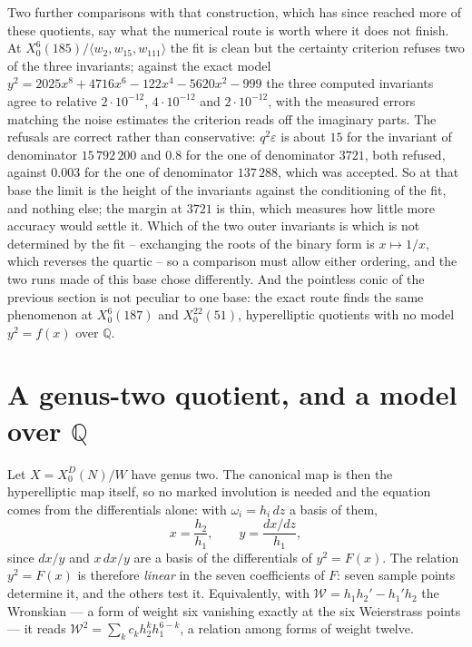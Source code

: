 \documentclass[11pt,reqno]{amsart}
\theoremstyle{plain}
\theoremstyle{definition}
\newcommand{\Q}{\mathbb{Q}}
\begin{document}
Two further comparisons with that construction, which has since reached more of these quotients,
say what the numerical route is worth where it does not finish. At
$X_0^{6}(185)/\langle w_2,w_{15},w_{111}\rangle$ the fit is clean but the certainty criterion
refuses two of the three invariants; against the exact model
$y^2=2025x^8+4716x^6-122x^4-5620x^2-999$ the three computed invariants agree to relative
$2\cdot10^{-12}$, $4\cdot10^{-12}$ and $2\cdot10^{-12}$, with the measured errors matching the
noise estimates the criterion reads off the imaginary parts. The refusals are correct rather than
conservative: $q^2\varepsilon$ is about $15$ for the invariant of denominator $15\,792\,200$ and
$0.8$ for the one of denominator $3721$, both refused, against $0.003$ for the one of denominator
$137\,288$, which was accepted. So at that base the limit is the height of the invariants against
the conditioning of the fit, and nothing else; the margin at $3721$ is thin, which measures how
little more accuracy would settle it. Which of the two outer invariants is which is not
determined by the fit -- exchanging the roots of the binary form is $x\mapsto1/x$, which reverses
the quartic -- so a comparison must allow either ordering, and the two runs made of this base
chose differently. And the pointless conic of the previous
section is not peculiar to one base: the exact route finds the same phenomenon at
$X_0^{6}(187)$ and $X_0^{22}(51)$, hyperelliptic quotients with no model $y^2=f(x)$ over $\Q$.

\section{A genus-two quotient, and a model over $\Q$}\label{sec:genus2}

Let $X=X_0^D(N)/W$ have genus two. The canonical map is then the hyperelliptic map itself, so no
marked involution is needed and the equation comes from the differentials alone: with
$\omega_i=h_i\,dz$ a basis of them,
\[
  x=\frac{h_2}{h_1},\qquad y=\frac{dx/dz}{h_1},
\]
since $dx/y$ and $x\,dx/y$ are a basis of the differentials of $y^2=F(x)$. The relation
$y^2=F(x)$ is therefore \emph{linear} in the seven coefficients of $F$: seven sample points
determine it, and the others test it. Equivalently, with $\mathcal W=h_1h_2'-h_1'h_2$ the
Wronskian --- a form of weight six vanishing exactly at the six Weierstrass points --- it reads
$\mathcal W^2=\sum_k c_kh_2^kh_1^{6-k}$, a relation among forms of weight twelve.
\end{document}
